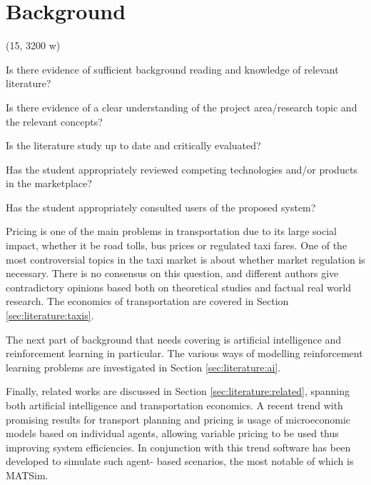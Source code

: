 \newpage
\section{Background}
\label{sec:literature}

(15, 3200 w)

Is there evidence of sufficient background reading and knowledge of relevant
literature?

Is there evidence of a clear understanding of the project area/research topic
and the relevant concepts?

Is the literature study up to date and critically evaluated?

Has the student appropriately reviewed competing technologies and/or products
in the marketplace?

Has the student appropriately consulted users of the proposed system?


Pricing is one of the main problems in transportation due to its large social
impact, whether it be road tolls, bus prices or regulated taxi fares. One of
the most controversial topics in the taxi market is about whether market
regulation is necessary. There is no consensus on this question, and different
authors give contradictory opinions based both on theoretical studies and
factual real world research. The economics of transportation are covered in
Section \ref{sec:literature:taxis}.

The next part of background that needs covering is artificial intelligence and
reinforcement learning in particular. The various ways of modelling
reinforcement learning problems are investigated in Section
\ref{sec:literature:ai}.

Finally, related works are discussed in Section \ref{sec:literature:related},
spanning both artificial intelligence and transportation economics. A recent
trend with promising results for transport planning and pricing is usage of
microeconomic models based on individual agents, allowing variable pricing to
be used thus improving system efficiencies. In conjunction with this trend
software has been developed to simulate such agent- based scenarios, the most
notable of which is MATSim.
